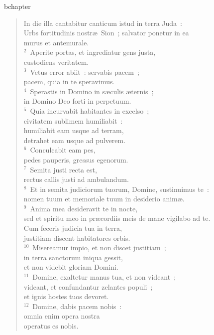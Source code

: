 bchapter\begin{verse}\vspace{-19pt}In die illa cantabitur canticum istud in terra Juda~:\\ Urbs fortitudinis nostr\ae\ Sion~; salvator ponetur in ea\\ murus et antemurale.\\
${}^{2}$~Aperite portas, et ingrediatur gens justa,\\ custodiens veritatem.\\
${}^{3}$~Vetus error abiit~: servabis pacem~;\\ pacem, quia in te speravimus.\\
${}^{4}$~Sperastis in Domino in s\ae culis \ae ternis~;\\ in Domino Deo forti in perpetuum.\\
${}^{5}$~Quia incurvabit habitantes in excelso~;\\ civitatem sublimem humiliabit~:\\ humiliabit eam usque ad terram,\\ detrahet eam usque ad pulverem.\\
${}^{6}$~Conculcabit eam pes,\\ pedes pauperis, gressus egenorum.\\
${}^{7}$~Semita justi recta est,\\ rectus callis justi ad ambulandum.\\
${}^{8}$~Et in semita judiciorum tuorum, Domine, sustinuimus te~:\\ nomen tuum et memoriale tuum in desiderio anim\ae .\\
${}^{9}$~Anima mea desideravit te in nocte,\\ sed et spiritu meo in pr\ae cordiis meis de mane vigilabo ad te.\\ Cum feceris judicia tua in terra,\\ justitiam discent habitatores orbis.\\
${}^{10}$~Misereamur impio, et non discet justitiam~;\\ in terra sanctorum iniqua gessit,\\ et non videbit gloriam Domini.\\
${}^{11}$~Domine, exaltetur manus tua, et non videant~;\\ videant, et confundantur zelantes populi~;\\ et ignis hostes tuos devoret.\\
${}^{12}$~Domine, dabis pacem nobis~:\\ omnia enim opera nostra\\ operatus es nobis.\\

\end{verse}
